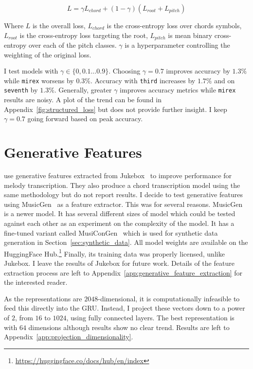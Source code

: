 \begin{equation}\label{eq:structured_loss}
    L = \gamma L_{chord} + (1-\gamma)(L_{root} + L_{pitch})
\end{equation}

Where $L$ is the overall loss, $L_{chord}$ is the cross-entropy loss over chords symbols, $L_{root}$ is the cross-entropy loss targeting the root, $L_{pitch}$ is mean binary cross-entropy over each of the pitch classes. $\gamma$ is a hyperparameter controlling the weighting of the original loss. 

I test models with $\gamma\in\{0, 0.1 \ldots 0.9\}$. Choosing $\gamma=0.7$ improves accuracy by $1.3\%$ while \texttt{mirex} worsens by $0.3\%$. Accuracy with \texttt{third} increases by $1.7\%$ and on \texttt{seventh} by $1.3\%$. Generally, greater $\gamma$ improves accuracy metrics while \texttt{mirex} results are noisy. A plot of the trend can be found in Appendix~\ref{fig:structured_loss} but does not provide further insight. I keep $\gamma=0.7$ going forward based on peak accuracy. 

\section{Generative Features}\label{sec:generative_features}

\citet{MelodyTranscriptionViaGenerativePreTraining} use generative features extracted from Jukebox~\citep{Jukebox} to improve performance for melody transcription. They also produce a chord transcription model using the same methodology but do not report results. I decide to test generative features using MusicGen~\citep{MusicGen} as a feature extractor. This was for several reasons. MusicGen is a newer model. It has several different sizes of model which could be tested against each other as an experiment on the complexity of the model. It has a fine-tuned variant called MusiConGen~\citep{MusiConGen} which is used for synthetic data generation in Section~\ref{sec:synthetic_data}. All model weights are available on the HuggingFace Hub.\footnote{\url{https://huggingface.co/docs/hub/en/index}} Finally, its training data was properly licensed, unlike Jukebox. I leave the results of Jukebox for future work. Details of the feature extraction process are left to Appendix~\ref{app:generative_feature_extraction} for the interested reader.

As the representations are $2048$-dimensional, it is computationally infeasible to feed this directly into the GRU. Instead, I project these vectors down to a power of $2$, from $16$ to $1024$, using fully connected layers. The best representation is with $64$ dimensions although results show no clear trend. Results are left to Appendix~\ref{app:projection_dimensionality}.

